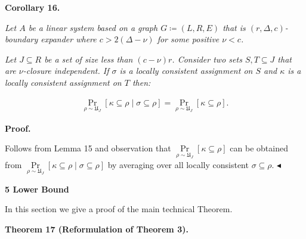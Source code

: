 \documentclass[10pt,a4paper]{article}
\begin{document}


\par\medskip\noindent\textbf{
\textbf{Corollary 16}\textbf{.}
}\par



\emph{Let $A$ be a linear system based on a graph $G\coloneqq(L,R,E)$ that is $(r,\Delta,c)$-boundary expander where $c>2(\Delta-\nu)$ for some positive $\nu<c$.}\par




\emph{Let $J\subseteq R$ be a set of size less than $(c-\nu)r$. Consider two sets $S,T\subseteq J$ that
are $\nu$-closure independent. If $\sigma$ is a locally consistent assignment on $S$ and
$\kappa$ is a locally consistent assignment on $T$ then:}\par


\[\begin{gathered}
\Pr\limits_{\rho\sim\mathfrak{U}_{J}}[\kappa\subseteq\rho\mid\sigma\subseteq%
\rho]=\Pr\limits_{\rho\sim\mathfrak{U}_{J}}[\kappa\subseteq\rho].
\end{gathered}\]







\par\medskip\noindent\textbf{Proof.}\par




Follows from Lemma 15 and observation that
$\Pr\limits_{\rho\sim\mathfrak{U}_{J}}[\kappa\subseteq\rho]$ can be obtained from
$\Pr\limits_{\rho\sim\mathfrak{U}_{J}}[\kappa\subseteq\rho\mid\sigma\subseteq\rho]$ by
averaging over all locally consistent $\sigma\subseteq\rho$.
$\blacktriangleleft$\par







\par\medskip\noindent\textbf{
5 Lower Bound}\par




In this section we give a proof of the main technical Theorem.\par





\par\medskip\noindent\textbf{
\textbf{Theorem 17}\textbf{ }(Reformulation of Theorem 3)\textbf{.}
}\par
\end{document}
